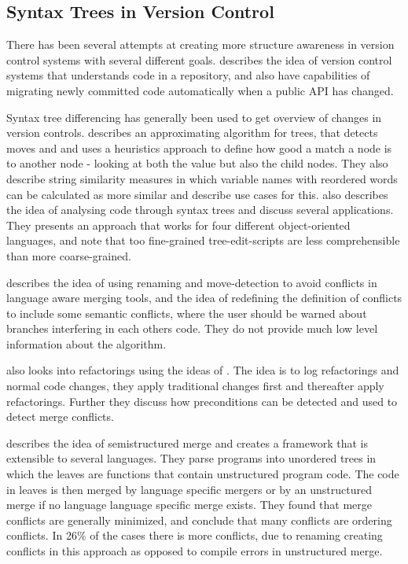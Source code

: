 \documentclass[11pt]{article}
\begin{document}
\subsection{Syntax Trees in Version Control}
There has been several attempts at creating more structure awareness in version control systems with several different goals. \citet{Freese} describes the idea of version control systems that understands code in a repository, and also have capabilities of migrating newly committed code automatically when a public API has changed.

Syntax tree differencing has generally been used to get overview of changes in version controls. \citet{Fluri} describes an approximating algorithm for trees, that  detects moves and and uses a heuristics approach to define how good a match a node is to another node - looking at both the value but also the child nodes. They also describe string similarity measures in which variable names with reordered words can be calculated as more similar and describe use cases for this. \citet{Hashimoto} also describes the idea of analysing code through syntax trees and discuss several applications. They presents an approach that works for four different object-oriented languages, and note that too fine-grained tree-edit-scripts are less comprehensible than more coarse-grained.

\citet{Hunt} describes the idea of using renaming and move-detection to avoid conflicts in language aware merging tools, and the idea of redefining the definition of conflicts to include some semantic conflicts, where the user should be warned about branches interfering in each others code. They do not provide much low level information about the algorithm.

\citet{Ekman} also looks into refactorings using the ideas of \citet{Lippe}. The idea is to log refactorings and normal code changes, they apply traditional changes first and thereafter apply refactorings. Further they discuss how preconditions can be detected and used to detect merge conflicts.

\citet{Apel} describes the idea of semistructured merge and creates a framework that is extensible to several languages. They parse programs into unordered trees in which the leaves are functions that contain unstructured program code. The code in leaves is then merged by language specific mergers or by an unstructured merge if no language language specific merge exists. They found that merge conflicts are generally minimized, and conclude that many conflicts are ordering conflicts. In 26\% of the cases there is more conflicts, due to renaming creating conflicts in this approach as opposed to compile errors in unstructured merge.
\end{document}
